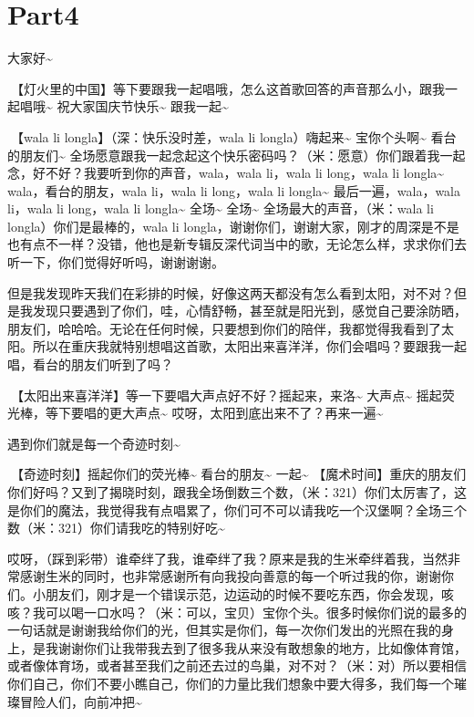 \documentclass[
]{book}
\begin{document}
\section{Part4}\label{chongqing-20241006-part4}

大家好\textasciitilde{}

🎵【灯火里的中国】等下要跟我一起唱哦，怎么这首歌回答的声音那么小，跟我一起唱哦\textasciitilde{} 祝大家国庆节快乐\textasciitilde{} 跟我一起\textasciitilde{}

🎵【wala li longla】（深：快乐没时差，wala li longla）嗨起来\textasciitilde{} 宝你个头啊\textasciitilde{} 看台的朋友们\textasciitilde{} 全场愿意跟我一起念起这个快乐密码吗？（米：愿意）你们跟着我一起念，好不好？我要听到你的声音，wala，wala li，wala li long，wala li longla\textasciitilde{} wala，看台的朋友，wala li，wala li long，wala li longla\textasciitilde{} 最后一遍，wala，wala li，wala li long，wala li longla\textasciitilde{} 全场\textasciitilde{} 全场\textasciitilde{} 全场最大的声音，（米：wala li longla）你们是最棒的，wala li longla，谢谢你们，谢谢大家，刚才的周深是不是也有点不一样？没错，他也是新专辑反深代词当中的歌，无论怎么样，求求你们去听一下，你们觉得好听吗，谢谢谢谢。

但是我发现昨天我们在彩排的时候，好像这两天都没有怎么看到太阳，对不对？但是我发现只要遇到了你们，哇，心情舒畅，甚至就是阳光到，感觉自己要涂防晒，朋友们，哈哈哈。无论在任何时候，只要想到你们的陪伴，我都觉得我看到了太阳。所以在重庆我就特别想唱这首歌，太阳出来喜洋洋，你们会唱吗？要跟我一起唱，看台的朋友们听到了吗？

🎵【太阳出来喜洋洋】等一下要唱大声点好不好？摇起来，来洛\textasciitilde{} 大声点\textasciitilde{} 摇起荧光棒，等下要唱的更大声点\textasciitilde{} 哎呀，太阳到底出来不了？再来一遍\textasciitilde{}

遇到你们就是每一个奇迹时刻\textasciitilde{}

🎵【奇迹时刻】摇起你们的荧光棒\textasciitilde{} 看台的朋友\textasciitilde{} 一起\textasciitilde{} 【魔术时间】重庆的朋友们你们好吗？又到了揭晓时刻，跟我全场倒数三个数，（米：321）你们太厉害了，这是你们的魔法，我觉得我有点唱累了，你们可不可以请我吃一个汉堡啊？全场三个数（米：321）你们请我吃的特别好吃\textasciitilde{}

哎呀，（踩到彩带）谁牵绊了我，谁牵绊了我？原来是我的生米牵绊着我，当然非常感谢生米的同时，也非常感谢所有向我投向善意的每一个听过我的你，谢谢你们。小朋友们，刚才是一个错误示范，边运动的时候不要吃东西，你会发现，咳咳？我可以喝一口水吗？（米：可以，宝贝）宝你个头。很多时候你们说的最多的一句话就是谢谢我给你们的光，但其实是你们，每一次你们发出的光照在我的身上，是我谢谢你们让我带我去到了很多我从来没有敢想象的地方，比如像体育馆，或者像体育场，或者甚至我们之前还去过的鸟巢，对不对？（米：对）所以要相信你们自己，你们不要小瞧自己，你们的力量比我们想象中要大得多，我们每一个璀璨冒险人们，向前冲把\textasciitilde{}
\end{document}
